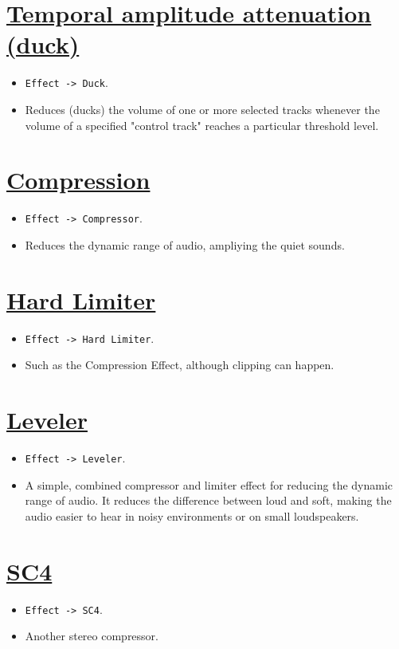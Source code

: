 \section{\href{http://manual.audacityteam.org/o/man/auto_duck.html}{Temporal amplitude attenuation (duck)}}
\begin{itemize}
\item \verb|Effect -> Duck|.
\item Reduces (ducks) the volume of one or more selected tracks
  whenever the volume of a specified "control track" reaches a
  particular threshold level.
\end{itemize}

\section{\href{http://manual.audacityteam.org/o/man/compressor.html}{Compression}}
\begin{itemize}
\item \verb|Effect -> Compressor|.
\item Reduces the dynamic range of audio, ampliying the quiet sounds.
\end{itemize}

\section{\href{http://manual.audacityteam.org/o/man/hard_limiter.html}{Hard Limiter}}
\begin{itemize}
\item \verb|Effect -> Hard Limiter|.
\item Such as the Compression Effect, although clipping can happen.
\end{itemize}

\section{\href{http://manual.audacityteam.org/o/man/leveler.html}{Leveler}}
\begin{itemize}
\item \verb|Effect -> Leveler|.
\item A simple, combined compressor and limiter effect for reducing
  the dynamic range of audio. It reduces the difference between loud
  and soft, making the audio easier to hear in noisy environments or
  on small loudspeakers.
\end{itemize}

\section{\href{http://manual.audacityteam.org/o/man/sc4.html}{SC4}}
\begin{itemize}
\item \verb|Effect -> SC4|.
\item Another stereo compressor.
\end{itemize}

